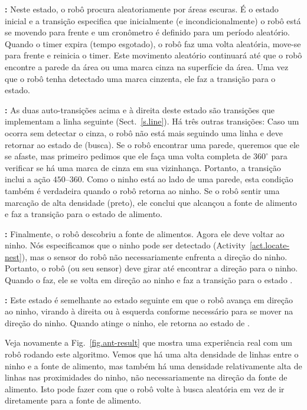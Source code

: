 \noindent\textbf{:} Neste estado, o robô procura aleatoriamente por áreas escuras. É o estado inicial e a transição  especifica que inicialmente (e incondicionalmente) o robô está se movendo para frente e um cronômetro é definido para um período aleatório. Quando o timer expira (tempo esgotado), o robô faz uma volta aleatória, move-se para frente e reinicia o timer. Este movimento aleatório continuará até que o robô encontre a parede da área ou uma marca cinza na superfície da área.  Uma vez que o robô tenha detectado uma marca cinzenta, ele faz a transição para o estado.

\smallskip

\noindent\textbf{:} As duas auto-transições acima e à direita deste estado são transições que implementam a linha seguinte (Sect.~\ref{s.line}). Há três outras transições: Caso um  ocorra sem detectar o cinza, o robô não está mais seguindo uma linha e deve retornar ao estado de \p (busca). Se o robô encontrar uma parede, queremos que ele se afaste, mas primeiro pedimos que ele faça uma volta completa de $360^\circ$ para verificar se há uma marca de cinza em sua vizinhança. Portanto, a transição inclui a ação $450$--$360$. Como o ninho está ao lado de uma parede, esta condição também é verdadeira quando o robô retorna ao ninho. Se o robô sentir uma marcação de alta densidade (preto), ele conclui que alcançou a fonte de alimento e faz a transição para o estado de alimento.

\smallskip

\noindent\textbf{:} Finalmente, o robô descobriu a fonte de alimentos. Agora ele deve voltar ao ninho. Nós especificamos que o ninho pode ser detectado (Activity~\ref{act.locate-nest}), mas o sensor do robô não necessariamente enfrenta a direção do ninho. Portanto, o robô (ou seu sensor) deve girar até encontrar a direção para o ninho. Quando o faz, ele se volta em direção ao ninho e faz a transição para o estado .

\smallskip

\noindent\textbf{:} Este estado é semelhante ao estado {seguinte} em que o robô avança em direção ao ninho, virando à direita ou à esquerda conforme necessário para se mover na direção do ninho. Quando atinge o ninho, ele retorna ao estado de .

\smallskip

Veja novamente a Fig.~\ref{fig.ant-result} que mostra uma experiência real com um robô rodando este algoritmo. Vemos que há uma alta densidade de linhas entre o ninho e a fonte de alimento, mas também há uma densidade relativamente alta de linhas nas proximidades do ninho, não necessariamente na direção da fonte de alimento. Isto pode fazer com que o robô volte à busca aleatória em vez de ir diretamente para a fonte de alimento.

